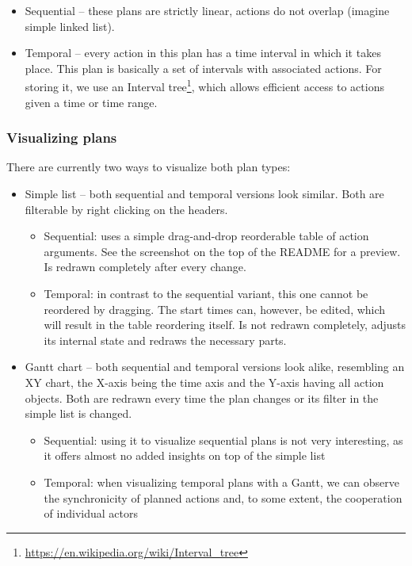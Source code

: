 \begin{itemize}
\item Sequential -- these plans are strictly linear, actions do not overlap (imagine simple linked list).
\item Temporal -- every action in this plan has a time interval in which it takes place.
This plan is basically a set of intervals with associated actions. For storing it, we use an
Interval tree\footnote{\url{https://en.wikipedia.org/wiki/Interval_tree}},
which allows efficient access to actions given a time or time range.
\end{itemize}

\subsubsection*{Visualizing plans}

There are currently two ways to visualize both plan types:

\begin{itemize}
\item Simple list -- both sequential and temporal versions look similar. Both are filterable by right clicking on the headers.
\begin{itemize}
\item Sequential: uses a simple drag-and-drop reorderable table of action arguments.
See the screenshot on the top of the README for a preview. Is redrawn completely after every change.

\item Temporal: in contrast to the sequential variant, this one cannot be reordered by dragging. The start times can, however,
be edited, which will result in the table reordering itself. Is not redrawn completely, adjusts its internal state and
redraws the necessary parts.
\end{itemize}

\item Gantt chart -- both sequential and temporal versions look alike, resembling an XY chart, the X-axis being the time
axis and the Y-axis having all action objects. Both are redrawn every time the plan changes or its filter
in the simple list is changed.
\begin{itemize}
\item Sequential: using it to visualize sequential plans is not very interesting, as it offers almost no added insights on top of the simple list

\item Temporal: when visualizing temporal plans with a Gantt, we can observe the synchronicity of planned actions
and, to some extent, the cooperation of individual actors
\end{itemize}
\end{itemize}

